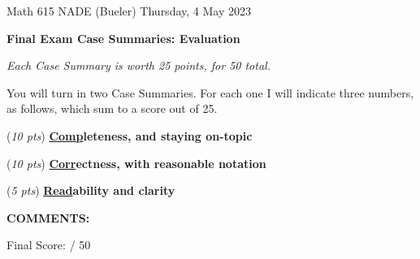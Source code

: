 \documentclass[12pt]{amsart}
\begin{document}
\scriptsize \noindent Math 615 NADE (Bueler) \hfill  Thursday, 4 May 2023
\normalsize\bigskip

\thispagestyle{empty}
\noindent\large\centerline{\textbf{Final Exam Case Summaries: Evaluation}} \normalsize

\medskip
\noindent\centerline{\emph{Each Case Summary is worth 25 points, for 50 total.}}

\bigskip
\noindent You will turn in two Case Summaries.  For each one I will indicate three numbers, as follows, which sum to a score out of 25.

\vspace{0.25in}

\noindent (\emph{10 pts}) \textbf{\underline{Comp}leteness, and staying on-topic}  
\vspace{0.3in}

\noindent (\emph{10 pts}) \textbf{\underline{Corr}ectness, with reasonable notation}
\vspace{0.3in}

\noindent (\emph{5 pts}) \textbf{\underline{Read}ability and clarity}
\vspace{0.35in}


\noindent \textbf{COMMENTS:}
\vfill

\hfill
Final Score: \underline{\phantom{dlkfjadklja f sdakfj}} / 50
\end{document}
